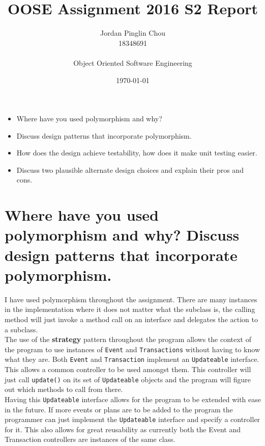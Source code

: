 \documentclass{article}
\begin{document}
\author{Jordan Pinglin Chou\\
  18348691\\\\
  Object Oriented Software Engineering\\}
\date{\today}
\title{OOSE Assignment 2016 S2 Report}
\maketitle

	\begin{itemize}
        \item Where have you used polymorphism and why?
        \item Discuss design patterns that incorporate polymorphism.
        \item How does the design achieve testability, how does it make unit testing easier.
        \item Discuss two plausible alternate design choices and explain their pros and cons.
    \end{itemize}

\section*{Where have you used polymorphism and why? Discuss design patterns that incorporate polymorphism.}

I have used polymorphism throughout the assignment. There are many instances in the implementation where it does not matter what the subclass is, the calling method will just invoke a method call on an interface and delegates the action to a subclass.\\

The use of the \textbf{strategy} pattern throughout the program allows the context of the program to use instances of \texttt{Event} and \texttt{Transactions} without having to know what they are. Both \texttt{Event} and \texttt{Transaction} implement an \texttt{Updateable} interface. This allows a common controller to be used amongst them. This controller will just call \texttt{update()} on its set of \texttt{Updateable} objects and the program will figure out which methods to call from there.\\ 

Having this \texttt{Updateable} interface allows for the program to be extended with ease in the future. If more events or plans are to be added to the program the programmer can just implement the \texttt{Updateable} interface and specify a controller for it. This also allows for great reusability as currently both the Event and Transaction controllers are instances of the same class.\\
\end{document}
